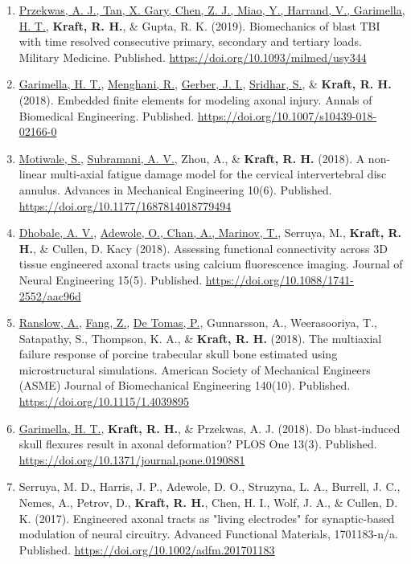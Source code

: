 \documentclass[a4paper,10pt]{article}
\begin{document}
\begin{enumerate}
 \item	\underline{Przekwas, A. J., Tan, X. Gary, Chen, Z. J., Miao, Y., Harrand, V., Garimella, H. T.}, \textbf{\textbf{Kraft,} R. H.}, \&
 Gupta, R. K. (2019). Biomechanics of blast TBI with time resolved consecutive primary, secondary and tertiary loads. Military Medicine. Published. \url{https://doi.org/10.1093/milmed/usy344}
 \item	\underline{Garimella, H. T.}, \underline{Menghani, R.}, \underline{Gerber, J. I.}, \underline{Sridhar, S.}, \&
 \textbf{\textbf{Kraft,} R. H.} (2018). Embedded finite elements for modeling axonal injury. Annals of Biomedical Engineering. Published. \url{https://doi.org/10.1007/s10439-018-02166-0}
 \item	\underline{Motiwale, S.}, \underline{Subramani, A. V.}, Zhou, A., \&
 \textbf{\textbf{Kraft,} R. H.} (2018). A non-linear multi-axial fatigue damage model for the cervical intervertebral disc annulus. Advances in Mechanical Engineering 10(6). Published. \url{https://doi.org/10.1177/1687814018779494}
 \item	\underline{Dhobale, A. V.}, \underline{Adewole, O., Chan, A., Marinov, T.}, Serruya, M., \textbf{\textbf{Kraft,} R. H.}, \&
 Cullen, D. Kacy (2018). Assessing functional connectivity across 3D tissue engineered axonal tracts using calcium fluorescence imaging. Journal of Neural Engineering 15(5). Published. \url{https://doi.org/10.1088/1741-2552/aac96d}
 \item	\underline{Ranslow, A.}, \underline{Fang, Z.}, \underline{De Tomas, P.}, Gunnarsson, A., Weerasooriya, T., Satapathy, S., Thompson, K. A., \&
 \textbf{\textbf{Kraft,} R. H.} (2018). The multiaxial failure response of porcine trabecular skull bone estimated using microstructural simulations. American Society of Mechanical Engineers (ASME) Journal of Biomechanical Engineering 140(10). Published. \url{https://doi.org/10.1115/1.4039895}
 \item	\underline{Garimella, H. T.}, \textbf{\textbf{Kraft,} R. H.}, \&
 Przekwas, A. J. (2018). Do blast-induced skull flexures result in axonal deformation? PLOS One 13(3). Published. \url{https://doi.org/10.1371/journal.pone.0190881}
 \item	Serruya, M. D., Harris, J. P., Adewole, D. O., Struzyna, L. A., Burrell, J. C., Nemes, A., Petrov, D., \textbf{\textbf{Kraft,} R. H.}, Chen, H. I., Wolf, J. A., \&
 Cullen, D. K. (2017). Engineered axonal tracts as    "living electrodes" for synaptic-based modulation of neural circuitry. Advanced Functional Materials, 1701183-n/a. Published. \url{https://doi.org/10.1002/adfm.201701183}

\end{enumerate}
\end{document}
